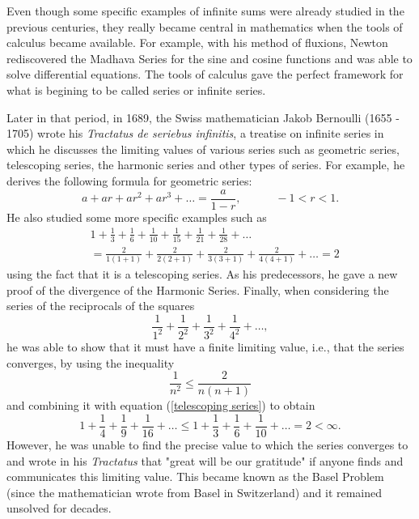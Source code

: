 Even though some specific examples of infinite sums were already studied in the previous centuries, they really became central in  mathematics when the tools of calculus became available. For example, with his method of fluxions, Newton rediscovered the Madhava Series for the sine and cosine functions and was able to solve differential equations. The tools of calculus gave the perfect framework for what is begining to be called series or infinite series.

Later in that period, in 1689, the Swiss mathematician Jakob Bernoulli (1655 - 1705) wrote his \textit{Tractatus de seriebus infinitis}, a treatise on infinite series in which he discusses the limiting values of various series such as geometric series, telescoping series, the harmonic series and other types of series. For example, he derives the following formula for geometric series:
\begin{equation}
    a + ar + ar^2 + ar^3 + \dots = \frac{a}{1-r}, \qquad \quad -1 < r < 1.
\end{equation}
He also studied some more specific examples such as
\begin{equation}\label{telescoping series}
    \begin{split}
        & 1 + \frac{1}{3} + \frac{1}{6} + \frac{1}{10} + \frac{1}{15} + \frac{1}{21} + \frac{1}{28} + \dots \\
        & = \frac{2}{1(1+1)} + \frac{2}{2(2+1)} + \frac{2}{3(3+1)} + \frac{2}{4(4+1)} + \dots = 2
    \end{split}
\end{equation}
using the fact that it is a telescoping series. As his predecessors, he gave a new proof of the divergence of the Harmonic Series. Finally, when considering the series of the reciprocals of the squares 
$$\frac{1}{1^2} + \frac{1}{2^2} + \frac{1}{3^2} + \frac{1}{4^2} + \dots,$$
he was able to show that it must have a finite limiting value, i.e., that the series converges, by using the inequality 
$$\frac{1}{n^2} \leq \frac{2}{n(n+1)}$$
and combining it with equation (\ref{telescoping series}) to obtain
$$1 + \frac{1}{4} + \frac{1}{9} + \frac{1}{16} + \dots \leq 1 + \frac{1}{3} + \frac{1}{6} + \frac{1}{10} + \dots = 2 < \infty.$$
However, he was unable to find the precise value to which the series converges to and wrote in his \textit{Tractatus} that "great will be our gratitude" if anyone finds and communicates this limiting value. This became known as the Basel Problem (since the mathematician wrote from Basel in Switzerland) and it remained unsolved for decades.

